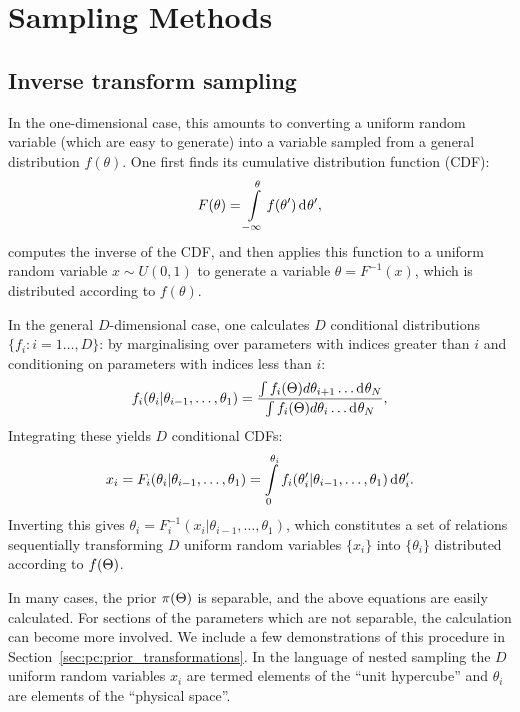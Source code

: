 \chapter{Sampling Methods}
\label{chap:sm}

\section{Inverse transform sampling}
\label{sec:sm:inverse_transform}

In the one-dimensional case, this amounts to converting a uniform random variable (which are easy to generate) into a variable sampled from a general distribution $f(\theta)$. One first finds its cumulative distribution function (CDF):
\begin{equation}
  F(\theta) = \int\limits_{-\infty}^\theta f(\theta^\prime) \operatorname{d}^{}\!{\theta^\prime},
\end{equation}
computes the inverse of the CDF, and then applies this function to a uniform random variable  $x\sim U(0,1)$ to generate a variable $\theta = F^{-1}(x)$, which is distributed according to $f(\theta)$. 

In the general $D$-dimensional case, one calculates $D$ conditional distributions $\{f_i:i=1\ldots,D\}$: by marginalising over parameters with indices greater than $i$ and conditioning on parameters with indices less than $i$:
%
\begin{equation}
  f_i(\theta_i|\theta_{i-1},\ldots,\theta_1) 
  =
  \frac{%
    \int f_i(\params) d\theta_{i+1}\ldots \d{\theta_{N}}
  }{%
    \int f_i(\params) d\theta_{i}\ldots \d{\theta_{N}}
  },
\end{equation}
%
Integrating these yields $D$ conditional CDFs:
%
\begin{equation}
  x_i = F_i(\theta_i|\theta_{i-1},\ldots,\theta_1) = \int\limits_0^{\theta_i} f_i(\theta_i^\prime|\theta_{i-1},\ldots,\theta_1) \operatorname{d}^{}\!{\theta_i^\prime}.
\end{equation}
%
Inverting this gives $\theta_i = F^{-1}_i(x_i|\theta_{i-1},\ldots,\theta_1)$, which constitutes a set of relations sequentially transforming $D$ uniform random variables $\{x_i\}$ into $\{\theta_i\}$ distributed according to $f(\Theta)$.

In many cases, the prior $\pi(\Theta)$ is separable, and the above equations are easily calculated. For sections of the parameters which are not separable, the calculation can become more involved. We include a few demonstrations of this procedure in Section~\ref{sec:pc:prior_transformations}. In the language of nested sampling the $D$ uniform random variables $x_i$ are termed elements of the ``unit hypercube'' and $\theta_i$ are elements of the ``physical space''.

